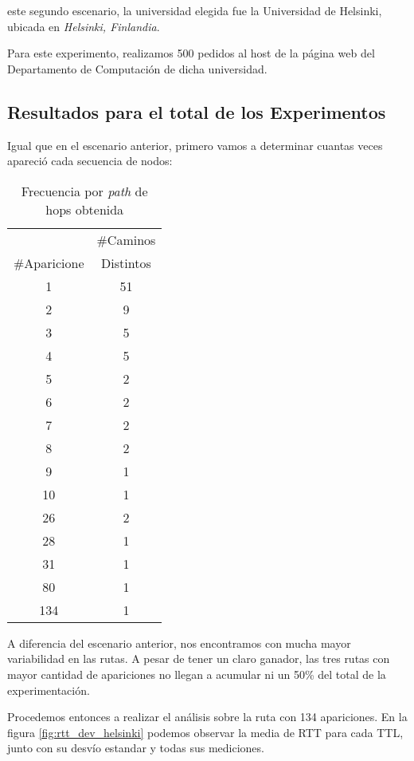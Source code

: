  este segundo escenario, la universidad elegida fue la Universidad de Helsinki\cite{helsinki}, ubicada en \emph{Helsinki, Finlandia}. 

\par Para este experimento, realizamos 500 pedidos al host de la p\'agina web del Departamento de Computaci\'on de dicha universidad\cite{helsinkics}. 

\subsection{Resultados para el total de los Experimentos}
\par Igual que en el escenario anterior, primero vamos a determinar cuantas veces apareci\'o cada secuencia de nodos:

\begin{table}[h]
    \centering
    \begin{tabular}{c | c}
                   &\#Caminos \\
      \#Aparicione &Distintos \\
      \hline\hline
       	1& 51\\
       	2& 9\\
        3& 5\\
        4& 5\\
		5& 2\\
        6& 2\\
        7& 2\\
        8& 2\\
        9& 1\\
       10& 1\\
       26& 2\\
       28& 1\\
       31& 1\\
       80& 1\\
      134& 1\\       
      \hline\hline
    \end{tabular}
    \bigskip
    \caption{Frecuencia por \emph{path} de hops obtenida}
    \label{tab:helsinki_sec_hops}
\end{table}

\par A diferencia del escenario anterior, nos encontramos con mucha mayor variabilidad en las rutas. A pesar de tener un claro ganador, las tres rutas con mayor cantidad de apariciones no llegan a acumular ni un 50\% del total de la experimentaci\'on.

\par Procedemos entonces a realizar el an\'alisis sobre la ruta con 134 apariciones. En la figura \ref{fig:rtt_dev_helsinki} podemos observar la media de RTT para cada TTL, junto con su desv\'io estandar y todas sus mediciones.

